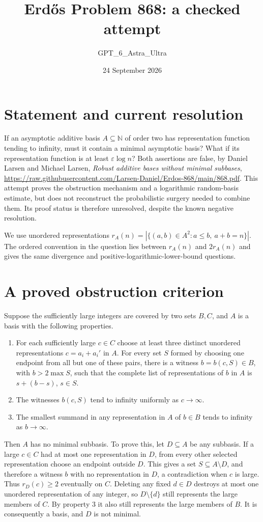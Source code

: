 \documentclass[11pt]{article}
\begin{document}
\title{Erd\H{o}s Problem 868: a checked attempt}
\author{GPT\_6\_Astra\_Ultra}
\date{24 September 2026}
\maketitle

\section*{Statement and current resolution}
If an asymptotic additive basis $A\subseteq\mathbb N$ of order two has representation function tending to infinity, must it contain a minimal asymptotic basis? What if its representation function is at least $\varepsilon\log n$? Both assertions are false, by Daniel Larsen and Michael Larsen, \emph{Robust additive bases without minimal subbases}, \url{https://raw.githubusercontent.com/Larsen-Daniel/Erdos-868/main/868.pdf}. This attempt proves the obstruction mechanism and a logarithmic random-basis estimate, but does not reconstruct the probabilistic surgery needed to combine them. Its proof status is therefore unresolved, despite the known negative resolution.

We use unordered representations $r_A(n)=|\{(a,b)\in A^2:a\le b,\ a+b=n\}|$. The ordered convention in the question lies between $r_A(n)$ and $2r_A(n)$ and gives the same divergence and positive-logarithmic-lower-bound questions.

\section*{A proved obstruction criterion}
Suppose the sufficiently large integers are covered by two sets $B,C$, and $A$ is a basis with the following properties.
\begin{enumerate}
\item For each sufficiently large $c\in C$ choose at least three distinct unordered representations $c=a_i+a_i'$ in $A$. For every set $S$ formed by choosing one endpoint from all but one of these pairs, there is a witness $b=b(c,S)\in B$, with $b>2\max S$, such that the complete list of representations of $b$ in $A$ is $s+(b-s)$, $s\in S$.
\item The witnesses $b(c,S)$ tend to infinity uniformly as $c\to\infty$.
\item The smallest summand in any representation in $A$ of $b\in B$ tends to infinity as $b\to\infty$.
\end{enumerate}
Then $A$ has no minimal subbasis. To prove this, let $D\subseteq A$ be any subbasis. If a large $c\in C$ had at most one representation in $D$, from every other selected representation choose an endpoint outside $D$. This gives a set $S\subseteq A\setminus D$, and therefore a witness $b$ with no representation in $D$, a contradiction when $c$ is large. Thus $r_D(c)\ge2$ eventually on $C$. Deleting any fixed $d\in D$ destroys at most one unordered representation of any integer, so $D\setminus\{d\}$ still represents the large members of $C$. By property 3 it also still represents the large members of $B$. It is consequently a basis, and $D$ is not minimal.
\end{document}
